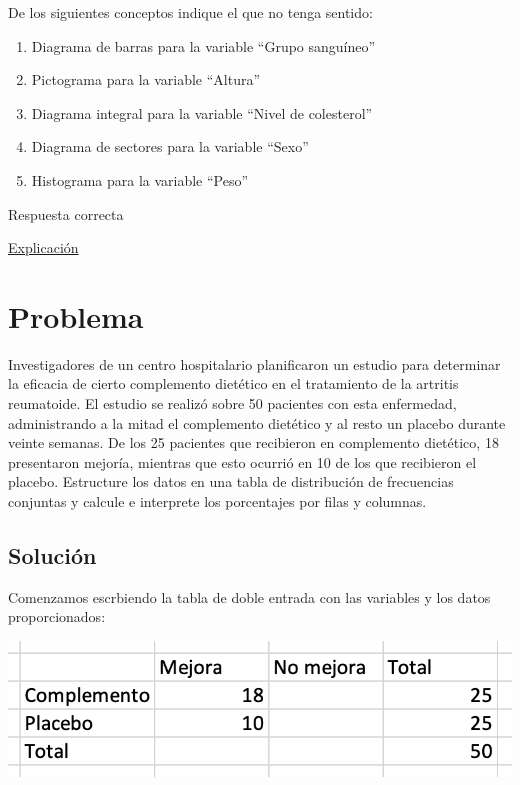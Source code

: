 \documentclass[
]{book}
\providecommand{\tightlist}{%
  \setlength{\itemsep}{0pt}\setlength{\parskip}{0pt}}
\begin{document}
De los siguientes conceptos indique el que no tenga sentido:

\begin{enumerate}
\def\labelenumi{\alph{enumi})}
\tightlist
\item
  Diagrama de barras para la variable ``Grupo sanguíneo''
\item
  Pictograma para la variable ``Altura''
\item
  Diagrama integral para la variable ``Nivel de colesterol''
\item
  Diagrama de sectores para la variable ``Sexo''
\item
  Histograma para la variable ``Peso''
\end{enumerate}

Respuesta correcta

\href{https://1fjmanzano.github.io/bioestadistica/otros-gra\%CC\%81ficos.html}{Explicación}

\hypertarget{problema-9}{%
\section{Problema}\label{problema-9}}

Investigadores de un centro hospitalario planificaron un estudio para determinar la eficacia de cierto complemento dietético en el tratamiento de la artritis reumatoide. El estudio se realizó sobre 50 pacientes con esta enfermedad, administrando a la mitad el complemento dietético y al resto un placebo durante veinte semanas. De los 25 pacientes que recibieron en complemento dietético, 18 presentaron mejoría, mientras que esto ocurrió en 10 de los que recibieron el placebo. Estructure los datos en una tabla de distribución de frecuencias conjuntas y calcule e interprete los porcentajes por filas y columnas.

\hypertarget{soluciuxf3n-8}{%
\subsection{Solución}\label{soluciuxf3n-8}}

Comenzamos escrbiendo la tabla de doble entrada con las variables y los datos proporcionados:

\includegraphics[width=11.03in]{img/2_4}
\end{document}
